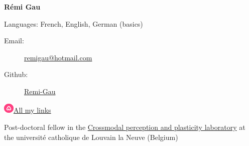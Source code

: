 \documentclass[a4paper,12pt,oneside]{letter}
\date{2021-04-10}
\begin{document}
\textbf{{\LARGE Rémi Gau}}

Languages: French, English, German (basics)

\doubleline

\begin{minipage}{.49\textwidth}
\begin{description}
    \item[Email:]
        \href{mailto:remi\textunderscore gau@hotmail.com}
            {remi\textunderscore gau@hotmail.com}
    \item[Github:]
        \href{https://github.com/Remi-Gau}{Remi-Gau}
 \end{description}
\end{minipage}
\begin{minipage}{.49\textwidth}
\begin{description}
    \item[\href{https://allmylinks.com/remi-gau}
                {\includegraphics[width=0.5cm]{./images/allmylinks.png}All my links}]
\end{description}
\end{minipage}
\vspace{10pt}

\doubleline


{



Post-doctoral fellow in the \href{https://cpplab.be/}{Crossmodal perception and plasticity laboratory}
at the université catholique de Louvain la Neuve (Belgium)























% 

}
\end{document}
